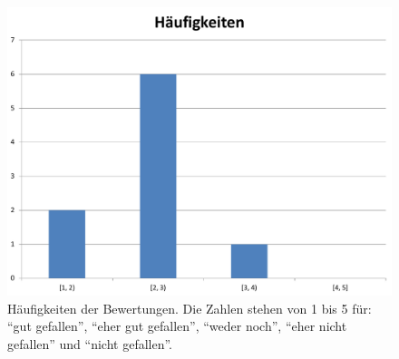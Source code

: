 \begin{figure}[h!tbp]
    \begin{center}
        \includegraphics[width=\textwidth]{images/haeufigkeiten}
    \end{center}
    \caption{Häufigkeiten der Bewertungen. Die Zahlen 
    stehen von 1 bis 5 für: \enquote{gut gefallen}, \enquote{eher gut 
    gefallen}, \enquote{weder noch}, \enquote{eher nicht gefallen} und 
    \enquote{nicht gefallen}.}
    \label{fig:haeufigkeiten}
\end{figure}



